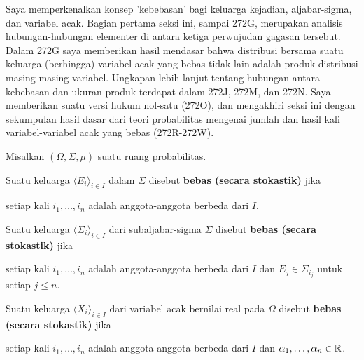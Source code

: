 
\def\hatcalBnu{\hat\Cal B_{\nu}}

\def\chaptername{Teori probabilitas}
\def\sectionname{Kebebasan}


Saya memperkenalkan konsep 'kebebasan' bagi keluarga kejadian,
aljabar-sigma, dan variabel acak. Bagian pertama seksi ini, sampai 272G,
merupakan analisis hubungan-hubungan elementer di antara ketiga perwujudan
gagasan tersebut. Dalam 272G saya memberikan hasil mendasar bahwa distribusi
bersama suatu keluarga (berhingga) variabel acak yang bebas tidak lain
adalah produk distribusi masing-masing variabel. Ungkapan lebih lanjut tentang
hubungan antara kebebasan dan ukuran produk terdapat dalam 272J, 272M,
dan 272N. Saya memberikan suatu versi hukum nol-satu (272O), dan mengakhiri
seksi ini dengan sekumpulan hasil dasar dari teori probabilitas mengenai jumlah
dan hasil kali variabel-variabel acak yang bebas (272R-272W).

 Misalkan $(\Omega,\Sigma,\mu)$ suatu
ruang probabilitas.

 Suatu keluarga $\langle E_i\rangle_{i\in I}$ dalam
$\Sigma$ disebut {\bf bebas (secara stokastik)} jika


\noindent setiap kali $i_1,\ldots,i_n$ adalah anggota-anggota berbeda dari $I$.

 Suatu keluarga $\langle\Sigma_i\rangle_{i\in I}$ dari
subaljabar-sigma $\Sigma$ disebut {\bf bebas (secara stokastik)}
jika


\noindent setiap kali $i_1,\ldots,i_n$ adalah anggota-anggota berbeda dari $I$
dan $E_j\in\Sigma_{i_j}$ untuk setiap $j\le n$.

 Suatu keluarga $\langle X_i\rangle_{i\in I}$ dari
variabel acak bernilai real pada $\Omega$ disebut {\bf bebas (secara
stokastik)} jika


\noindent setiap kali $i_1,\ldots,i_n$ adalah anggota-anggota berbeda dari $I$
dan $\alpha_1,\ldots,\alpha_n\in\Bbb R$.

